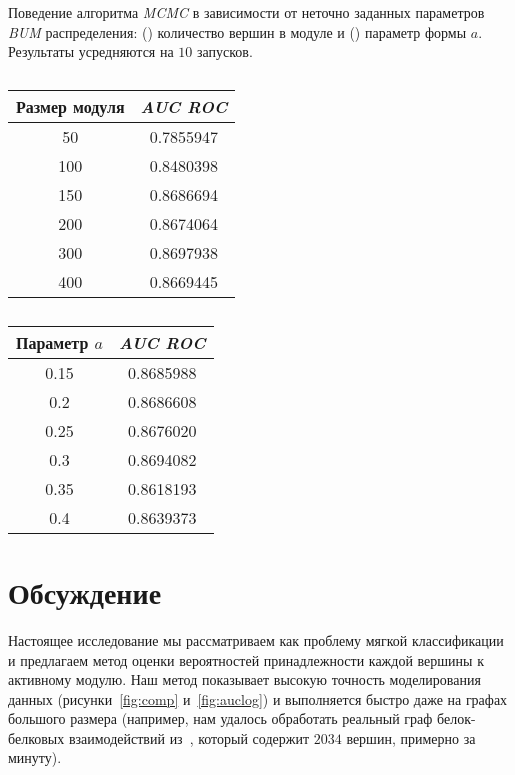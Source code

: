 \begin{table}[!htb]
    \captionsetup{justification=centering}
    \caption{
        Поведение алгоритма \emph{MCMC} в зависимости от неточно заданных
        параметров \emph{BUM} распределения: () количество
        вершин в модуле и () параметр формы $a$. Результаты
        усредняются на $10$ запусков.
    }
    \label{tab:bla}
    \begin{subtable}{.5\linewidth}
        \caption{}
        \begin{tabular}{c|c}
                Размер модуля &   \emph{AUC ROC} \\
                \hline
                50 & 0.7855947 \\
                100 & 0.8480398 \\
                150 & 0.8686694 \\
                200 & 0.8674064 \\
                300 & 0.8697938 \\
                400 & 0.8669445 \\
        \end{tabular}
        \label{tab:lambda}
    \end{subtable}%
    \begin{subtable}{.5\linewidth}
        \caption{}
        \begin{tabular}{c|c}
            Параметр $a$ &   \emph{AUC ROC} \\
            \hline
            0.15 & 0.8685988 \\
            0.2  & 0.8686608 \\
            0.25 & 0.8676020  \\
            0.3 & 0.8694082 \\
            0.35 & 0.8618193 \\
            0.4 & 0.8639373 \\
        \end{tabular}
        \label{tab:a}
    \end{subtable}
\end{table}





\section{Обсуждение}

Настоящее исследование мы рассматриваем как проблему мягкой классификации
и предлагаем метод оценки вероятностей принадлежности каждой вершины
к активному модулю.  Наш метод показывает высокую точность моделирования данных
(рисунки~\ref{fig:comp} и~\ref{fig:auclog}) и выполняется быстро даже на графах
большого размера (например, нам удалось обработать реальный граф белок-белковых
взаимодействий из~\cite{Dittrich2008a}, который содержит $2034$ вершин,
примерно за минуту).

